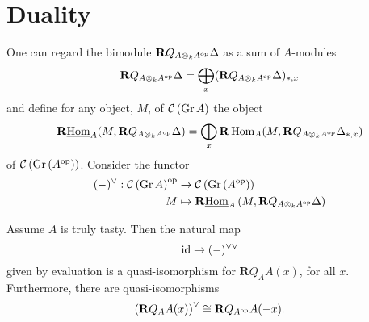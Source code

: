\section{Duality}

One can regard the bimodule \(\mathbf{R}Q_{A \otimes_k A^{\operatorname{op}}}\Delta\) as a sum of \(A\)-modules
\[\mathbf{R}Q_{A \otimes_k A^{\operatorname{op}}}\Delta = \bigoplus_{x} (\mathbf{R}Q_{A \otimes_k A^{\operatorname{op}}}\Delta)_{\ast,x}\]
and define for any object, \(M\), of \(\mathcal{C}\left(\operatorname{Gr}A\right)\) the object
\[\mathbf{R}\underline{\operatorname{Hom}}_A(M, \mathbf{R}Q_{A \otimes_k A^{\operatorname{op}}}\Delta) = \bigoplus_x \mathbf{R}\operatorname{Hom}_A(M, \mathbf{R}Q_{A \otimes_k A^{\operatorname{op}}}\Delta_{\ast,x})\]
of \(\mathcal{C}\left(\operatorname{Gr}\left(A^{{\operatorname{op}}}\right)\right)\).
Consider the functor
\begin{align*}
  (-)^{\vee} : \mathcal{C}\left(\operatorname{Gr}A\right)^{\operatorname{op}} & \to \mathcal{C}\left(\operatorname{Gr}\left(A^{{\operatorname{op}}}\right)\right) \\
  M & \mapsto \mathbf{R}\underline{\operatorname{Hom}}_A \left( M , \mathbf{R}Q_{A \otimes_k A^{\operatorname{op}}} \Delta \right)
\end{align*}

\begin{lemma} \label{lemma: duality really is a duality}
  Assume \(A\) is truly tasty. Then the natural map 
  \begin{displaymath}
    \operatorname{id} \to (-)^{\vee \vee}
  \end{displaymath}
  given by evaluation is a quasi-isomorphism for \(\mathbf{R}Q_A A(x)\), for all \(x\). Furthermore, there are quasi-isomorphisms
  \begin{displaymath}
    \left( \mathbf{R}Q_A A(x) \right)^\vee \cong \mathbf{R}Q_{A^{\operatorname{op}}} A(-x).
  \end{displaymath}
\end{lemma}

